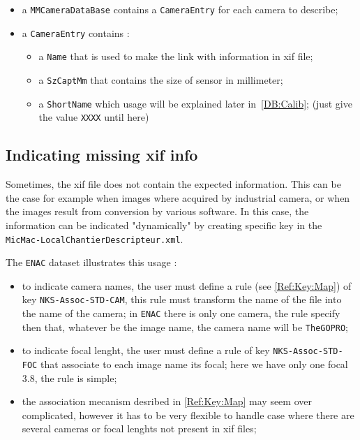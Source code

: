 \begin{itemize}
    \item a {\tt MMCameraDataBase} contains  a {\tt CameraEntry} for each  camera
          to describe;
    \item a {\tt CameraEntry} contains :

 
     \begin{itemize}
           \item a {\tt Name} that is used to make the link with information in xif file;
           \item a {\tt SzCaptMm} that contains the size of sensor in millimeter;
           \item a {\tt ShortName} which usage will be explained later  in~\ref{DB:Calib};
                (just give the value {\tt XXXX} until here)
     \end{itemize}
\end{itemize}


\subsection{Indicating missing xif info}

Sometimes, the xif file does not contain the expected information. This can be the
case for example when images where acquired by industrial camera, or when the images
result from conversion by various software. In this case, the information can be indicated "dynamically"
by creating specific key in the {\tt  MicMac-LocalChantierDescripteur.xml}.

The {\tt ENAC} dataset  illustrates this usage :

\begin{itemize}
    \item to indicate camera names, the user must define a rule 
           (see \ref{Ref:Key:Map}) of key  {\tt NKS-Assoc-STD-CAM}, this rule must
           transform the name of the file into the name of the camera;
           in {\tt ENAC} there is only one camera, the rule specify  then that,
           whatever be the image name, the camera name will be {\tt TheGOPRO};
 

    \item to indicate focal lenght, the user must define a rule 
          of key {\tt NKS-Assoc-STD-FOC} that associate to each image name
          its focal; here we have only one focal $3.8$, the rule is simple;


    \item the association mecanism desribed in \ref{Ref:Key:Map} may seem 
          over complicated, however it has to be very flexible to handle case
          where there are several cameras or focal lenghts not present in xif files;

\end{itemize}


